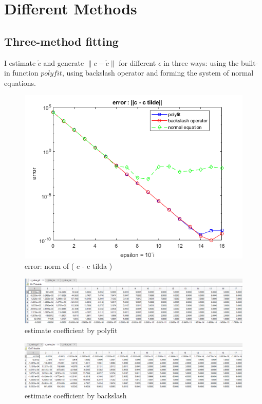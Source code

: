 \documentclass[a4paper]{article}
\begin{document}
\section{Different Methods}
\subsection{Three-method fitting}
I estimate $\tilde{c}$ and generate $\lVert c - \tilde{c}\rVert$ for different $\epsilon$ in three ways: using the built-in function $polyfit$, using backslash operator and forming the system of normal equations. 
\begin{figure}[H] 
\centering 
\includegraphics[width=1.0\textwidth]{2.1-1.png}
\caption{error: norm of ( c - c tilda )} 
\label{Fig.2.1-1} 
\end{figure}

\begin{figure}[H] 
\centering 
\includegraphics[width=1.0\textwidth]{2.1-2.png}
\caption{estimate coefficient by polyfit} 
\label{Fig.2.1-2} 
\end{figure}

\begin{figure}[H] 
\centering 
\includegraphics[width=1.0\textwidth]{2.1-3.png}
\caption{estimate coefficient by backslash} 
\label{Fig.2.1-3} 
\end{figure}
\end{document}
